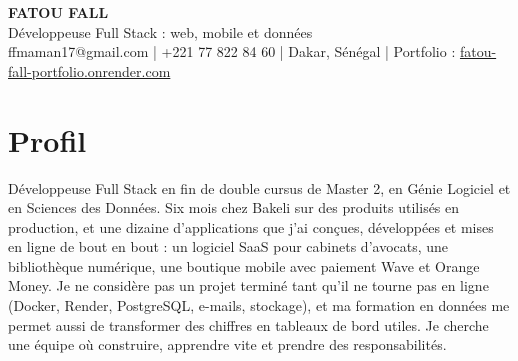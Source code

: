 \documentclass[10pt,a4paper]{article}
\begin{document}
\begin{center}
  {\fontsize{22}{26}\selectfont\bfseries FATOU FALL}\\[4pt]
  {\large\color{bleu} Développeuse Full Stack : web, mobile et données}\\[6pt]
  {\small ffmaman17@gmail.com \;|\; +221 77 822 84 60 \;|\; Dakar, Sénégal \;|\;
  Portfolio : \href{https://fatou-fall-portfolio.onrender.com}{fatou-fall-portfolio.onrender.com}}
\end{center}
\vspace{-2pt}{\color{bleu!40}\rule{\linewidth}{0.6pt}}

\section{Profil}
Développeuse Full Stack en fin de double cursus de Master 2, en Génie Logiciel et en Sciences des Données.
Six mois chez Bakeli sur des produits utilisés en production, et une dizaine d'applications que j'ai
conçues, développées et mises en ligne de bout en bout : un logiciel SaaS pour cabinets d'avocats, une
bibliothèque numérique, une boutique mobile avec paiement Wave et Orange Money. Je ne considère pas un
projet terminé tant qu'il ne tourne pas en ligne (Docker, Render, PostgreSQL, e-mails, stockage), et ma
formation en données me permet aussi de transformer des chiffres en tableaux de bord utiles. Je cherche
une équipe où construire, apprendre vite et prendre des responsabilités.

\end{document}
